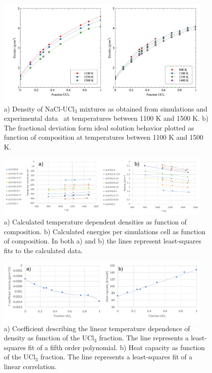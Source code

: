 \documentclass[preprint,3p,10pt,onecolumn,number,sort&compress]{elsarticle}
\begin{document}
\begin{figure}[htb]
\centering
\includegraphics[width=0.95\textwidth]{fig7.jpg}
\caption{a) Density of NaCl-UCl$_3$ mixtures as obtained from simulations and experimental data~\cite{Desyatnik} at temperatures between 1100 K and 1500 K. %
b) The fractional deviation form ideal solution behavior plotted as function of composition at temperatures between 1100 K and 1500 K. %
} 
\label{fig:NaClUCl3}
\end{figure}

\begin{figure}[htb]
\centering
\includegraphics[width=0.95\textwidth]{FIG6c.pdf}
\caption{a) Calculated temperature dependent densities as function of composition. b) Calculated energies per simulations cell as function of composition. In both a) and b) the lines represent least-squares fits to the calculated data.}  
\label{fig:NaClUCl3_t}
\end{figure}

\begin{figure}[htb]
\centering
\includegraphics[width=0.95\textwidth]{FIG6f.pdf}
\caption{a) Coefficient describing the linear temperature dependence of density as function of the UCl$_3$ fraction. The line represents a least-squares fit of a fifth order polynomial. b) Heat capacity as function of the UCl$_3$ fraction. The line represents a least-squares fit of a linear correlation.}
\label{fig:NaClUCl3_comp}
\end{figure}
\end{document}
